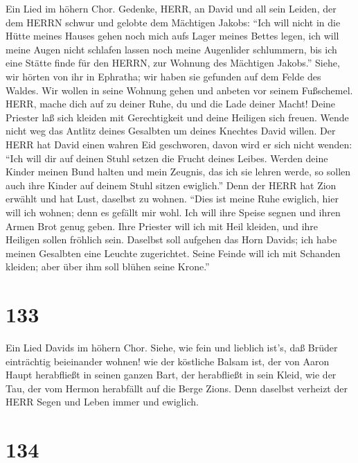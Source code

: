  Ein Lied im höhern Chor. Gedenke, HERR, an David und all
sein Leiden,  der dem HERRN schwur und gelobte dem Mächtigen
Jakobs:  ``Ich will nicht in die Hütte meines Hauses gehen
noch mich aufs Lager meines Bettes legen,  ich will meine
Augen nicht schlafen lassen noch meine Augenlider schlummern,
 bis ich eine Stätte finde für den HERRN, zur Wohnung des
Mächtigen Jakobs.''  Siehe, wir hörten von ihr in Ephratha;
wir haben sie gefunden auf dem Felde des Waldes.  Wir wollen
in seine Wohnung gehen und anbeten vor seinem Fußschemel. 
HERR, mache dich auf zu deiner Ruhe, du und die Lade deiner Macht!
 Deine Priester laß sich kleiden mit Gerechtigkeit und deine
Heiligen sich freuen.  Wende nicht weg das Antlitz deines
Gesalbten um deines Knechtes David willen.  Der HERR hat
David einen wahren Eid geschworen, davon wird er sich nicht wenden:
``Ich will dir auf deinen Stuhl setzen die Frucht deines Leibes.
 Werden deine Kinder meinen Bund halten und mein Zeugnis,
das ich sie lehren werde, so sollen auch ihre Kinder auf deinem Stuhl
sitzen ewiglich.''  Denn der HERR hat Zion erwählt und hat
Lust, daselbst zu wohnen.  ``Dies ist meine Ruhe ewiglich,
hier will ich wohnen; denn es gefällt mir wohl.  Ich will
ihre Speise segnen und ihren Armen Brot genug geben.  Ihre
Priester will ich mit Heil kleiden, und ihre Heiligen sollen fröhlich
sein.  Daselbst soll aufgehen das Horn Davids; ich habe
meinen Gesalbten eine Leuchte zugerichtet.  Seine Feinde
will ich mit Schanden kleiden; aber über ihm soll blühen seine Krone.''

\hypertarget{section-132}{%
\section{133}\label{section-132}}

 Ein Lied Davids im höhern Chor. Siehe, wie fein und
lieblich ist's, daß Brüder einträchtig beieinander wohnen! 
wie der köstliche Balsam ist, der von Aaron Haupt herabfließt in seinen
ganzen Bart, der herabfließt in sein Kleid,  wie der Tau,
der vom Hermon herabfällt auf die Berge Zions. Denn daselbst verheizt
der HERR Segen und Leben immer und ewiglich.

\hypertarget{section-133}{%
\section{134}\label{section-133}}

